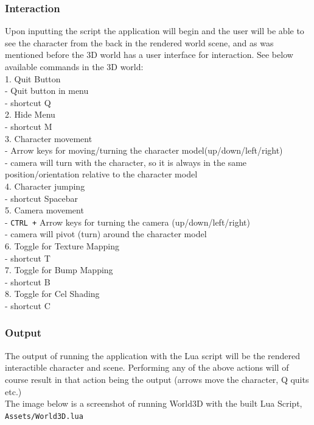 \documentclass {article}
\begin{document}
\subsubsection{Interaction}
Upon inputting the script the application will begin and the user will be able to see the character from the back in the rendered world scene, and as was mentioned before the 3D world has a user interface for interaction. See below available commands in the 3D world:\\
1. Quit Button\\
\indent - Quit button in menu\\
\indent - shortcut Q\\
2. Hide Menu\\
\indent - shortcut M\\
3. Character movement\\
\indent - Arrow keys for moving/turning the character model(up/down/left/right)\\
\indent - camera will turn with the character, so it is always in the same position/orientation relative to the \indent character model\\
4. Character jumping\\
\indent - shortcut Spacebar\\
5. Camera movement\\
\indent - \texttt{CTRL +} Arrow keys for turning the camera (up/down/left/right)\\
\indent - camera will pivot (turn) around the character model\\
6. Toggle for Texture Mapping\\
\indent - shortcut T\\
7. Toggle for Bump Mapping\\
\indent - shortcut B\\
8. Toggle for Cel Shading\\
\indent - shortcut C\\

\subsubsection{Output}
The output of running the application with the Lua script will be the rendered interactible character and scene. Performing any of the above actions will of course result in that action being the output (arrows move the character, Q quits etc.)\\
The image below is a screenshot of running World3D with the built Lua Script, \texttt{Assets/World3D.lua}\\
\newline
\end{document}
